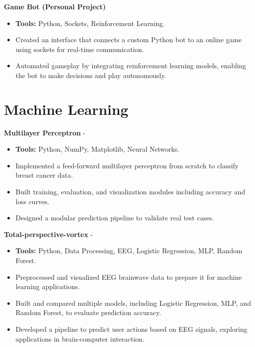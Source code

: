\documentclass[a4paper,11pt]{article}%
\begin{document}
%
\noindent \textbf{Game Bot (Personal Project)}%
\begin{itemize}[leftmargin=2em,parsep=0pt,topsep=1em]%
\item[] \textbf{Tools:} Python, Sockets, Reinforcement Learning.%
\item Created an interface that connects a custom Python bot to an online game using sockets for real-time communication.%
\item Automated gameplay by integrating reinforcement learning models, enabling the bot to make decisions and play autonomously.%
\end{itemize}%
%
\section*{Machine Learning}%
%
\noindent \textbf{Multilayer Perceptron} - \href{https://github.com/sboof911/Multilayer-Perceptron}{{}}%
\begin{itemize}[leftmargin=2em,parsep=0pt,topsep=1em]%
\item[] \textbf{Tools:} Python, NumPy, Matplotlib, Neural Networks.%
\item Implemented a feed-forward multilayer perceptron from scratch to classify breast cancer data.%
\item Built training, evaluation, and visualization modules including accuracy and loss curves.%
\item Designed a modular prediction pipeline to validate real test cases.%
\end{itemize}%
%
\noindent \textbf{Total-perspective-vortex} - \href{https://github.com/sboof911/total-perspectivevortex}{{}}%
\begin{itemize}[leftmargin=2em,parsep=0pt,topsep=1em]%
\item[] \textbf{Tools:} Python, Data Processing, EEG, Logistic Regression, MLP, Random Forest.%
\item Preprocessed and visualized EEG brainwave data to prepare it for machine learning applications.%
\item Built and compared multiple models, including Logistic Regression, MLP, and Random Forest, to evaluate prediction accuracy.%
\item Developed a pipeline to predict user actions based on EEG signals, exploring applications in brain-computer interaction.%
\end{itemize}%
\end{document}

